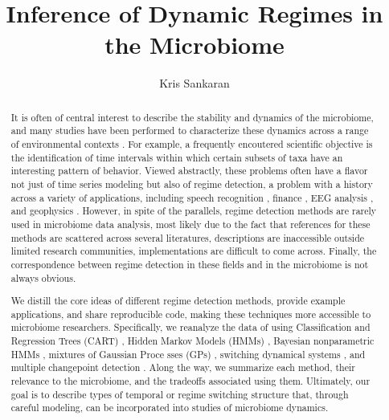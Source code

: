 \documentclass{article}
\title{Inference of Dynamic Regimes in the Microbiome}
\author{Kris Sankaran}
\begin{document}
\maketitle


\begin{abstract}
It is often of central interest to describe the stability and dynamics of the
microbiome, and many studies have been performed to characterize these dynamics
across a range of environmental contexts \citep{costello2012application,
  stein2013ecological, faust2015metagenomics}. For example, a frequently
encoutered scientific objective is the identification of time intervals within
which certain subsets of taxa have an interesting pattern of behavior. Viewed
abstractly, these problems often have a flavor not just of time series modeling
but also of regime detection, a problem with a history across a variety of
applications, including speech recognition \citep{fox2011sticky}, finance
\citep{lee2009optimal}, EEG analysis \citep{camilleri2014automatic}, and
geophysics \citep{weatherley2002relationship}. However, in spite of the
parallels, regime detection methods are rarely used in microbiome data analysis,
most likely due to the fact that references for these methods are scattered
across several literatures, descriptions are inaccessible outside limited
research communities, implementations are difficult to come across. Finally, the
correspondence between regime detection in these fields and in the microbiome is
not always obvious.

We distill the core ideas of different regime detection methods, provide example
applications, and share reproducible code, making these techniques more
accessible to microbiome researchers. Specifically, we reanalyze the data of
\citep{dethlefsen2011incomplete} using Classification and Regression Trees
(CART) \citep{breiman1984classification}, Hidden Markov Models (HMMs)
\citep{rabiner1986introduction}, Bayesian nonparametric HMMs
\citep{teh2010hierarchical}, mixtures of Gaussian Proce
sses (GPs)
\citep{rasmussen2002infinite}, switching dynamical systems
\citep{fox2009sharing}, and multiple changepoint detection
\citep{fan2015empirical}. Along the way, we summarize each method, their
relevance to the microbiome, and the tradeoffs associated using them.
Ultimately, our goal is to describe types of temporal or regime switching
structure that, through careful modeling, can be incorporated into studies of
microbiome dynamics.
\end{abstract}
\end{document}

